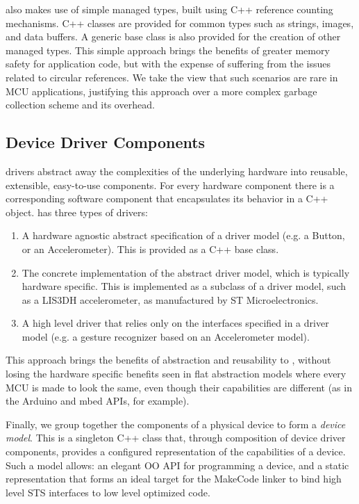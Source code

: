 \CO also makes use of simple managed types, built using C++ reference counting mechanisms. C++ classes are provided for common types such as strings, images, and data buffers. A generic base class is also provided for the creation of other managed types. This simple approach brings the benefits of greater memory safety for application code, but with the expense of suffering from the issues related to circular references. We take the view that such scenarios are rare in MCU applications, justifying this approach over a more complex garbage collection scheme and its overhead.

\subsection{Device Driver Components}
\CO drivers abstract away the complexities of the underlying hardware into reusable, extensible, easy-to-use components. For every hardware component there is a corresponding software component that encapsulates its behavior in a C++ object. \CO has three types of drivers:
\begin{enumerate}
    \item A hardware agnostic abstract specification of a driver model (e.g. a Button, or an Accelerometer). This is provided as a C++ base class.
    \item The concrete implementation of the abstract driver model, which is typically hardware specific. This is implemented as a subclass of a driver model, such as a LIS3DH accelerometer, as manufactured by ST Microelectronics.
    \item A high level driver that relies only on the interfaces specified in a driver model (e.g. a gesture recognizer based on an Accelerometer model).
\end{enumerate}

This approach brings the benefits of abstraction and re\-usability to \CON, without losing the hardware specific benefits seen in flat abstraction models where every MCU is made to look the same, even though their capabilities are different (as in the Arduino and mbed APIs, for example).

Finally, we group together the components of a physical device to form a \emph{device model}. This is a singleton C++ class that, through composition of device driver components, provides a configured representation of the capabilities of a device. Such a model allows: an elegant OO API for programming a device, and a static representation that forms an ideal target for the MakeCode linker to bind high level STS interfaces to low level optimized code.

